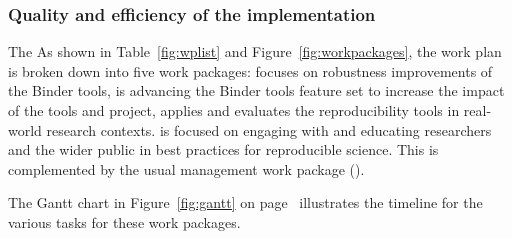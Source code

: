 

\subsubsection{Quality and efficiency of the implementation}\label{sec:workplan-structure}

\ifgrantagreement The \else As shown in Table~\ref{fig:wplist} and
Figure~\ref{fig:workpackages}, the \fi work plan is broken down into five work
packages:  focuses on robustness improvements of the
Binder tools,  is advancing the Binder tools feature set to
increase the impact of the tools and project,  applies and
evaluates the reproducibility tools in real-world research contexts.
 is focused on engaging with and educating researchers and the
wider public in best practices for reproducible science. This is complemented by
the usual management work package ().

The Gantt chart in Figure~\ref{fig:gantt} on page~\pageref{fig:gantt} illustrates the timeline for the various tasks for
these work packages. 

\ifgrantagreement\else
\wpfigstyle{\footnotesize\def\tabcolsep{3.5pt}}
{\wpfig}
\fi

